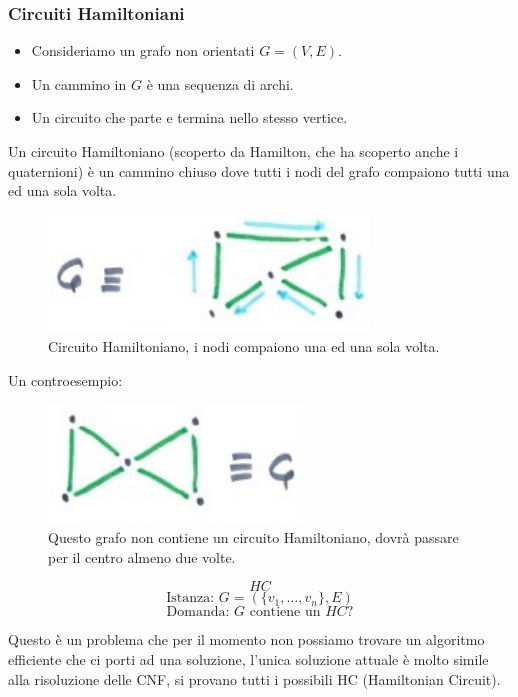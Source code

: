 \documentclass{article}
\begin{document}
\subsubsection{Circuiti Hamiltoniani}
\begin{itemize}
    \item Consideriamo un grafo non orientati $G=(V,E)$.
    \item Un cammino in $G$ è una sequenza di archi.
    \item Un circuito che parte e termina nello stesso vertice.
\end{itemize}
Un circuito Hamiltoniano (scoperto da Hamilton, che ha scoperto anche i quaternioni) è un cammino chiuso dove tutti i nodi del grafo compaiono
tutti una ed una sola volta.
\begin{figure}[H]
    \centering
    \includegraphics[scale=0.6]{images/hamiltonian_circuit.png}
    \caption{Circuito Hamiltoniano, i nodi compaiono una ed una sola volta.}
\end{figure}
Un controesempio:
\begin{figure}[H]
    \centering
    \includegraphics[scale=0.6]{images/non_hamiltonian.png}
    \caption{Questo grafo non contiene un circuito Hamiltoniano, dovrà passare per il centro
        almeno due volte.}
\end{figure}
$$HC$$
$$\text{Istanza: }G=(\{v_1,\dots,v_n\},E)$$
$$\text{Domanda: }G \text{ contiene un }HC?$$

Questo è un problema che per il momento non possiamo trovare un algoritmo efficiente
che ci porti ad una soluzione, l'unica soluzione attuale è molto simile alla risoluzione
delle CNF, si provano tutti i possibili HC (Hamiltonian Circuit).
\end{document}
